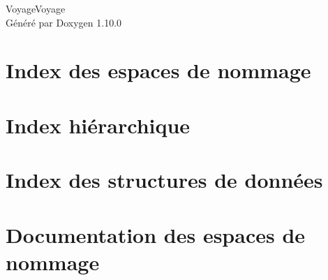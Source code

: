 \documentclass[twoside]{book}
\newcommand{\+}{\discretionary{\mbox{\scriptsize$\hookleftarrow$}}{}{}}
\newcommand{\clearemptydoublepage}{%
    \newpage{\pagestyle{empty}\cleardoublepage}%
  }
\begin{document}
  \raggedbottom
    \hypersetup{pageanchor=false,
                bookmarksnumbered=true,
                pdfencoding=unicode
               }
  \begin{titlepage}
  \vspace*{7cm}
  \begin{center}%
  {\Large Voyage\+Voyage}\\
  \vspace*{1cm}
  {\large Généré par Doxygen 1.10.0}\\
  \end{center}
  \end{titlepage}
  \clearemptydoublepage
  \tableofcontents
  \clearemptydoublepage
  \hypersetup{pageanchor=true}


\chapter{Index des espaces de nommage}

\chapter{Index hiérarchique}

\chapter{Index des structures de données}

\chapter{Documentation des espaces de nommage}


\end{document}
